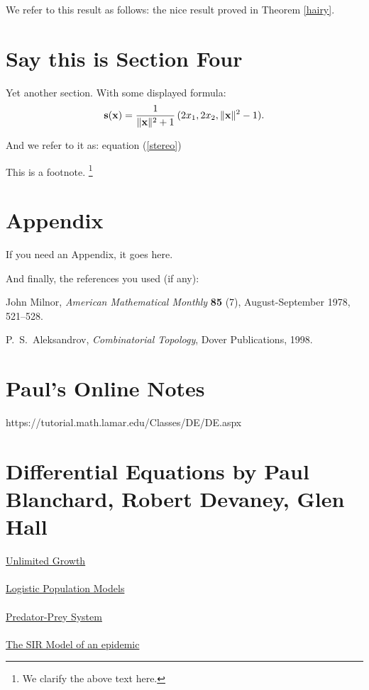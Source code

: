 \documentclass{amsart}
\theoremstyle{definition}
\numberwithin{equation}{section}
\def\ve#1{{\bf #1}}
\def\norm#1{\| {\bf #1} \|}
\begin{document}
\begin{sansmath}
We refer to this result as follows:
the nice result proved in Theorem \ref{hairy}.

\section{Say this is Section Four}

 Yet another section.
With some displayed formula:
    \begin{equation}
    \label{stereo}
       \ve s (\ve x) = {1 \over \norm{x}^2 + 1} \, (2 x_1, 2x_2, \norm{x}^2 - 1) .
    \end{equation}


  And we refer to it as: equation (\ref{stereo})

This is a footnote.
    \footnote{We clarify the above text here.}

    \medskip


\section{Appendix}

If you need an Appendix, it goes here.

\bigskip



And finally, the references you used (if any):


\begin{thebibliography}{12}

John Milnor, {\it
 American Mathematical Monthly}
    {\bf 85} (7), August-September 1978, 521--528.

 \smallskip

    P.~S.~Aleksandrov, {\it Combinatorial Topology},
    Dover Publications, 1998.


\end{thebibliography}


\newpage
\section{Paul's Online Notes}
https://tutorial.math.lamar.edu/Classes/DE/DE.aspx\\
\lipsum[0-2]

\section{Differential Equations by Paul Blanchard, Robert Devaney, Glen Hall}
\underline{Unlimited Growth}\\ %
\lipsum[2-4]\\
\underline{Logistic Population Models}\\ %
\lipsum[4-6]\\
\underline{Predator-Prey System}\\ %
\lipsum[6-8]\\
\underline{The SIR Model of an epidemic}\\ %
\lipsum[8-10]


\end{sansmath}
\end{document}
